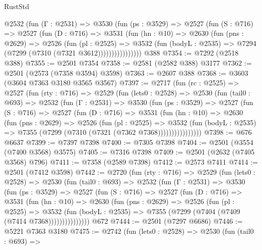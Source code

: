 \begin{lexlean}{RustStd}
\begin{coremodule}
            @2532
              (fun (Γ : @2531) =>
              @3530
                (fun (ps : @3529) =>
                @2527
                  (fun (S : @716) =>
                  @2527
                    (fun (D : @716) =>
                    @3531
                      (fun (hn : @10) =>
                      @2630
                        (fun (pns : @2629) =>
                        @2526
                          (fun (pl : @2525) =>
                          @3532
                            (fun (bodyL : @2535) => @7294 (@7299 (@7310 (@7321 @3612))))))))))))))))
    @388
@7354 := @7292 (@2518 @388)
@7355 := @2501 @7354
@7358 := @2581 (@2582 @388) @3177
@7362 := @2501 (@2573 (@7358 @3594) @3598)
@7363 := @2607 @388
@7368 := @3603 (@3604 @7363 @3180 @3565 @3567)
@7397 := @2717
    (fun (rc : @2525) =>
    @2527
      (fun (rty : @716) =>
      @2529
        (fun (lets0 : @2528) =>
        @2530
          (fun (tail0 : @693) =>
          @2532
            (fun (Γ : @2531) =>
            @3530
              (fun (ps : @3529) =>
              @2527
                (fun (S : @716) =>
                @2527
                  (fun (D : @716) =>
                  @3531
                    (fun (hn : @10) =>
                    @2630
                      (fun (pns : @2629) =>
                      @2526
                        (fun (pl : @2525) =>
                        @3532
                          (fun (bodyL : @2535) =>
                          @7355 (@7299 (@7310 (@7321 (@7362 @7368))))))))))))))))
@7398 := @676 @6637
@7399 := @7397 @7398
@7400 := @7305 @7398
@7404 := @2501 (@3554 (@7400 @3568) @3575)
@7405 := @7316 @7398
@7409 := @2501 (@2632 (@7405 @3568) @796)
@7411 := @7358 (@2589 @7398)
@7412 := @2573 @7411
@7414 := @2501 (@7412 @3598)
@7442 := @2720
    (fun (rty : @716) =>
    @2529
      (fun (lets0 : @2528) =>
      @2530
        (fun (tail0 : @693) =>
        @2532
          (fun (Γ : @2531) =>
          @3530
            (fun (ps : @3529) =>
            @2527
              (fun (S : @716) =>
              @2527
                (fun (D : @716) =>
                @3531
                  (fun (hn : @10) =>
                  @2630
                    (fun (pns : @2629) =>
                    @2526
                      (fun (pl : @2525) =>
                      @3532
                        (fun (bodyL : @2535) =>
                        @7355 (@7299 (@7404 (@7409 (@7414 @7368)))))))))))))))
    @672
@7444 := @2501 (@7297 @6686)
@7446 := @5221 @7363 @3180
@7475 := @2742
    (fun (lets0 : @2528) =>
    @2530
      (fun (tail0 : @693) =>

\end{coremodule}
\end{lexlean}
